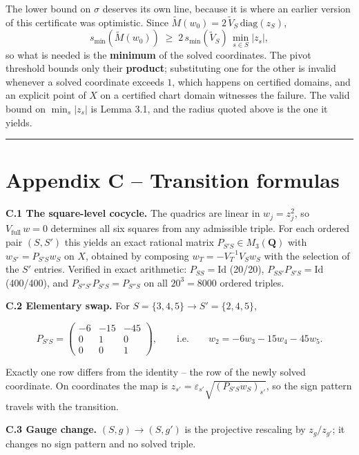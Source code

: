 The lower bound on \(\sigma\) deserves its own line, because it is where an earlier version of this certificate was optimistic. Since \(\tilde M(w_0) = 2\,\tilde V_S \,\mathrm{diag}(z_S)\), \[s_{\min}(\tilde M(w_0)) \;\ge\; 2\, s_{\min}(\tilde V_S)\,
\min_{s \in S}|z_s|,\] so what is needed is the \textbf{minimum} of the solved coordinates. The pivot threshold bounds only their \textbf{product}; substituting one for the other is invalid whenever a solved coordinate exceeds \(1\), which happens on certified domains, and an explicit point of \(X\) on a certified chart domain witnesses the failure. The valid bound on \(\min_s |z_s|\) is Lemma 3.1, and the radius quoted above is the one it yields.

\begin{center}\rule{\linewidth}{0.5pt}\end{center}

\section{Appendix C -- Transition formulas}\label{appendix-c-transition-formulas}

\textbf{C.1 The square-level cocycle.} The quadrics are linear in \(w_j = z_j^2\), so \(V_{\mathrm{full}}\, w = 0\) determines all six squares from any admissible triple. For each ordered pair \((S, S')\) this yields an exact rational matrix \(P_{S'S} \in M_3(\mathbf{Q})\) with \(w_{S'} = P_{S'S} w_S\) on \(X\), obtained by composing \(w_T = -V_T^{-1} V_S w_S\) with the selection of the \(S'\) entries. Verified in exact arithmetic: \(P_{SS} = \mathrm{Id}\) (20/20), \(P_{SS'}P_{S'S} = \mathrm{Id}\) (400/400), and \(P_{S''S'}P_{S'S} = P_{S''S}\) on all \(20^3 = 8000\) ordered triples.

\textbf{C.2 Elementary swap.} For \(S = \{3,4,5\} \to S' = \{2,4,5\}\),

\[P_{S'S} = \begin{pmatrix} -6 & -15 & -45 \\ 0 & 1 & 0 \\ 0 & 0 & 1
\end{pmatrix}, \qquad\text{i.e.}\qquad w_2 = -6w_3 - 15w_4 - 45w_5 .\]

Exactly one row differs from the identity -- the row of the newly solved coordinate. On coordinates the map is \(z_{s'} = \varepsilon_{s'}\sqrt{(P_{S'S} w_S)_{s'}}\), so the sign pattern travels with the transition.

\textbf{C.3 Gauge change.} \((S, g) \to (S, g')\) is the projective rescaling by \(z_g/z_{g'}\); it changes no sign pattern and no solved triple.

